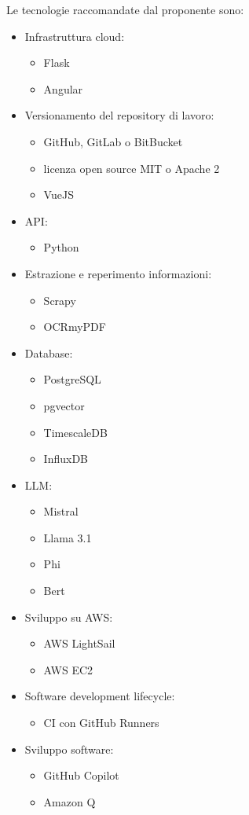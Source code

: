 \documentclass[10pt]{article}
\begin{document}
Le tecnologie raccomandate dal proponente sono:
\begin{itemize}
    \item Infrastruttura cloud:
    \begin{itemize}
        \item Flask
        \item Angular
    \end{itemize}
    \item Versionamento del repository di lavoro:
    \begin{itemize}
        \item GitHub, GitLab o BitBucket
        \item licenza open source MIT o Apache 2
        \item VueJS
    \end{itemize}
    \item API:
    \begin{itemize}
        \item Python
    \end{itemize}
    \item Estrazione e reperimento informazioni:
    \begin{itemize}
        \item Scrapy
        \item OCRmyPDF
    \end{itemize}
    \item Database:
    \begin{itemize}
        \item PostgreSQL
        \item pgvector
        \item TimescaleDB
        \item InfluxDB
    \end{itemize}
    \item LLM:
    \begin{itemize}
        \item Mistral
        \item Llama 3.1
        \item Phi
        \item Bert
    \end{itemize}
    \item Sviluppo su AWS:
    \begin{itemize}
        \item AWS LightSail
        \item AWS EC2
    \end{itemize}
    \item Software development lifecycle:
    \begin{itemize}
        \item CI con GitHub Runners
    \end{itemize}
    \item Sviluppo software:
    \begin{itemize}
        \item GitHub Copilot
        \item Amazon Q
    \end{itemize}
\end{itemize}
\end{document}

